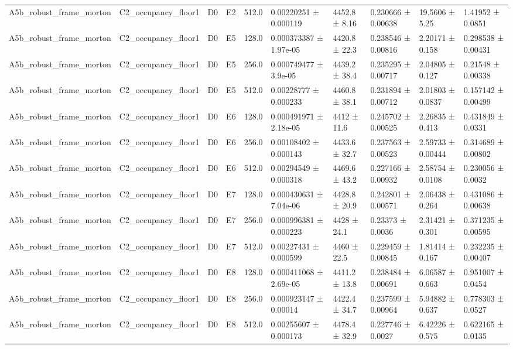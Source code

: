 \begin{table}
\begin{tabular}{llllllllll}
A5b\_robust\_frame\_morton & C2\_occupancy\_floor1 & D0 & E2 & 512.0 & 0.00220251 ± 0.000119 & 4452.8 ± 8.16 & 0.230666 ± 0.00638 & 19.5606 ± 5.25 & 1.41952 ± 0.0851 \\
A5b\_robust\_frame\_morton & C2\_occupancy\_floor1 & D0 & E5 & 128.0 & 0.000373387 ± 1.97e-05 & 4420.8 ± 22.3 & 0.238546 ± 0.00816 & 2.20171 ± 0.158 & 0.298538 ± 0.00431 \\
A5b\_robust\_frame\_morton & C2\_occupancy\_floor1 & D0 & E5 & 256.0 & 0.000749477 ± 3.9e-05 & 4439.2 ± 38.4 & 0.235295 ± 0.00717 & 2.04805 ± 0.127 & 0.21548 ± 0.00338 \\
A5b\_robust\_frame\_morton & C2\_occupancy\_floor1 & D0 & E5 & 512.0 & 0.00228777 ± 0.000233 & 4460.8 ± 38.1 & 0.231894 ± 0.00712 & 2.01803 ± 0.0837 & 0.157142 ± 0.00499 \\
A5b\_robust\_frame\_morton & C2\_occupancy\_floor1 & D0 & E6 & 128.0 & 0.000491971 ± 2.18e-05 & 4412 ± 11.6 & 0.245702 ± 0.00525 & 2.26835 ± 0.413 & 0.431849 ± 0.0331 \\
A5b\_robust\_frame\_morton & C2\_occupancy\_floor1 & D0 & E6 & 256.0 & 0.00108402 ± 0.000143 & 4433.6 ± 32.7 & 0.237563 ± 0.00523 & 2.59733 ± 0.00444 & 0.314689 ± 0.00802 \\
A5b\_robust\_frame\_morton & C2\_occupancy\_floor1 & D0 & E6 & 512.0 & 0.00294549 ± 0.000318 & 4469.6 ± 43.2 & 0.227166 ± 0.00932 & 2.58754 ± 0.0108 & 0.230056 ± 0.0032 \\
A5b\_robust\_frame\_morton & C2\_occupancy\_floor1 & D0 & E7 & 128.0 & 0.000430631 ± 7.04e-06 & 4428.8 ± 20.9 & 0.242801 ± 0.00571 & 2.06438 ± 0.264 & 0.431086 ± 0.00638 \\
A5b\_robust\_frame\_morton & C2\_occupancy\_floor1 & D0 & E7 & 256.0 & 0.000996381 ± 0.000223 & 4428 ± 24.1 & 0.23373 ± 0.0036 & 2.31421 ± 0.301 & 0.371235 ± 0.00595 \\
A5b\_robust\_frame\_morton & C2\_occupancy\_floor1 & D0 & E7 & 512.0 & 0.00227431 ± 0.000599 & 4460 ± 22.5 & 0.229459 ± 0.00845 & 1.81414 ± 0.167 & 0.232235 ± 0.00407 \\
A5b\_robust\_frame\_morton & C2\_occupancy\_floor1 & D0 & E8 & 128.0 & 0.000411068 ± 2.69e-05 & 4411.2 ± 13.8 & 0.238484 ± 0.00691 & 6.06587 ± 0.663 & 0.951007 ± 0.0454 \\
A5b\_robust\_frame\_morton & C2\_occupancy\_floor1 & D0 & E8 & 256.0 & 0.000923147 ± 0.00014 & 4422.4 ± 34.7 & 0.237599 ± 0.00964 & 5.94882 ± 0.637 & 0.778303 ± 0.0527 \\
A5b\_robust\_frame\_morton & C2\_occupancy\_floor1 & D0 & E8 & 512.0 & 0.00255607 ± 0.000173 & 4478.4 ± 32.9 & 0.227746 ± 0.0027 & 6.42226 ± 0.575 & 0.622165 ± 0.0135 \\

\end{tabular}
\end{table}
